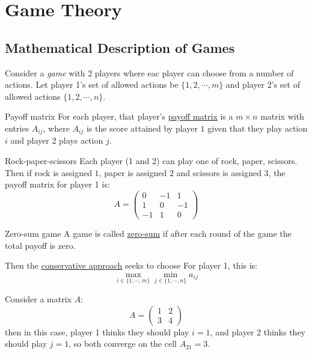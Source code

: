 \documentclass[../Main.tex]{subfiles}
\begin{document}
\section{Game Theory}
\subsection{Mathematical Description of Games}
Consider a \textit{game} with 2 players where eac player can choose from a number of actions. Let player 1's set of allowed actions be $\{1, 2, \cdots, m\}$ and player 2's set of allowed actions $\{1, 2, \cdots, n\}$.

\begin{definition}{Payoff matrix}
    For each player, that player's \underline{payoff matrix} is a $m \times n$ matrix with entries $A_{ij}$, where $A_{ij}$ is the score attained by player $1$ given that they play action $i$ and player 2 plays action $j$.
\end{definition}
\begin{example}{Rock-paper-scissors}
    Each player (1 and 2) can play one of rock, paper, scissors. Then if rock is assigned $1$, paper is assigned $2$ and scissors is assigned $3$, the payoff matrix for player 1 is:
    \begin{equation*}
        A =
        \begin{pmatrix}
            0 & -1 & 1 \\
            1 & 0 & -1 \\
            -1 & 1 & 0
        \end{pmatrix}
    \end{equation*}
\end{example}
\begin{definition}{Zero-sum game}
    A game is called \underline{zero-sum} if after each round of the game the total payoff is zero.
\end{definition}
Then the \underline{conservative approach} seeks to choose %
For player 1, this is:
\begin{equation*}
    \max_{i \in \{1, \cdots, m\}} \min_{j \in \{1, \cdots, n\}} a_{ij}
\end{equation*}
\begin{example}
    Consider a matrix $A$:
    \begin{equation*}
        A =
        \begin{pmatrix}
            1 & 2 \\
            3 & 4
        \end{pmatrix}
    \end{equation*}
    then in this case, player 1 thinks they should play $i = 1$, and player 2 thinks they should play $j = 1$, so both converge on the cell $A_{21} = 3$.
\end{example}
\end{document}
